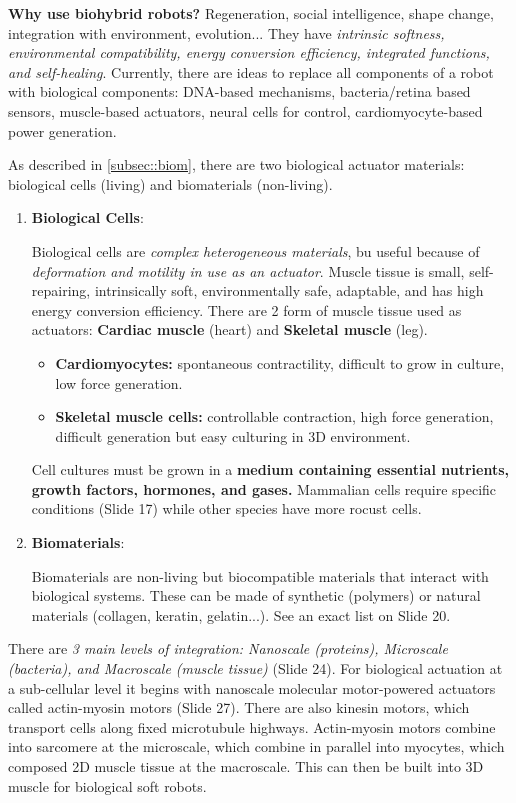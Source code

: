 \documentclass[onecolumn,a4paper]{article}
\begin{document}
\textbf{Why use biohybrid robots?} Regeneration, social intelligence, shape change, integration with environment, evolution... They have \emph{intrinsic softness, environmental compatibility, energy conversion efficiency, integrated functions, and self-healing}. Currently, there are ideas to replace all components of a robot with biological components: DNA-based mechanisms, bacteria/retina based sensors, muscle-based actuators, neural cells for control, cardiomyocyte-based power generation.

As described in \ref{subsec::biom}, there are two biological actuator materials: biological cells (living) and biomaterials (non-living).
\begin{enumerate}
    \item \textbf{Biological Cells}:

    Biological cells are \emph{complex heterogeneous materials}, bu useful because of \emph{deformation and motility in use as an actuator}. Muscle tissue is small, self-repairing, intrinsically soft, environmentally safe, adaptable, and has high energy conversion efficiency. There are 2 form of muscle tissue used as actuators: \textbf{Cardiac muscle} (heart) and \textbf{Skeletal muscle} (leg).
    \begin{itemize}
        \item \textbf{Cardiomyocytes:} spontaneous contractility, difficult to grow in culture, low force generation.
        \item \textbf{Skeletal muscle cells:} controllable contraction, high force generation, difficult generation but easy culturing in 3D environment.
    \end{itemize}
    Cell cultures must be grown in a \textbf{medium containing essential nutrients, growth factors, hormones, and gases.} Mammalian cells require specific conditions (Slide 17) while other species have more rocust cells.

    \item \textbf{Biomaterials}:

    Biomaterials are non-living but biocompatible materials that interact with biological systems. These can be made of synthetic (polymers) or natural materials (collagen, keratin, gelatin...). See an exact list on Slide 20.
\end{enumerate}

There are \emph{3 main levels of integration: Nanoscale (proteins), Microscale (bacteria), and Macroscale (muscle tissue)} (Slide 24). For biological actuation at a sub-cellular level it begins with nanoscale molecular motor-powered actuators called actin-myosin motors (Slide 27). There are also kinesin motors, which transport cells along fixed microtubule highways. Actin-myosin motors combine into sarcomere at the microscale, which combine in parallel into myocytes, which composed 2D muscle tissue at the macroscale. This can then be built into 3D muscle for biological soft robots.
\end{document}
